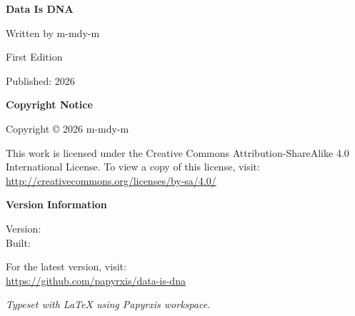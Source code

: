 \thispagestyle{empty}

\vspace*{\fill}

\begin{flushleft}
\textbf{Data Is DNA}

\vspace{0.5em}

Written by m-mdy-m

\vspace{1em}

First Edition

\vspace{0.5em}

Published: 2026

\vspace{2em}

\textbf{Copyright Notice}

\vspace{0.5em}

Copyright © 2026 m-mdy-m

This work is licensed under the Creative Commons Attribution-ShareAlike 4.0 
International License. To view a copy of this license, visit:
\url{http://creativecommons.org/licenses/by-sa/4.0/}

\vspace{2em}

\textbf{Version Information}

\vspace{0.5em}

Version: \ProjectVersion \\
Built: \BuildDate

\vspace{1em}

For the latest version, visit: \\
\url{https://github.com/papyrxis/data-is-dna}

\vspace{1em}

\textit{Typeset with \LaTeX{} using Papyrxis workspace.}

\end{flushleft}

\clearpage
